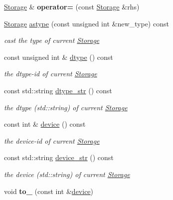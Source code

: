 \begin{DoxyCompactItemize}
\mbox{\label{classcytnx_1_1Storage_a1ee2ea67e2197bc9d690ca8a1b878f73}} 
\hyperlink{classcytnx_1_1Storage}{Storage} \& {\bfseries operator=} (const \hyperlink{classcytnx_1_1Storage}{Storage} \&rhs)
\item 
\hyperlink{classcytnx_1_1Storage}{Storage} \hyperlink{classcytnx_1_1Storage_a8310d8dbb70510272ded2e3d01be25f0}{astype} (const unsigned int \&new\+\_\+type) const
\begin{DoxyCompactList}\small\item\em cast the type of current \hyperlink{classcytnx_1_1Storage}{Storage} \end{DoxyCompactList}\item 
const unsigned int \& \hyperlink{classcytnx_1_1Storage_a643824801e81ab86aca055f1dd1f34d7}{dtype} () const
\begin{DoxyCompactList}\small\item\em the dtype-\/id of current \hyperlink{classcytnx_1_1Storage}{Storage} \end{DoxyCompactList}\item 
const std\+::string \hyperlink{classcytnx_1_1Storage_ab6e9fb01ad4655701a2d54dc978eef17}{dtype\+\_\+str} () const
\begin{DoxyCompactList}\small\item\em the dtype (std\+::string) of current \hyperlink{classcytnx_1_1Storage}{Storage} \end{DoxyCompactList}\item 
const int \& \hyperlink{classcytnx_1_1Storage_a4c3e27582d7f951e6b76ccbb92f7c537}{device} () const
\begin{DoxyCompactList}\small\item\em the device-\/id of current \hyperlink{classcytnx_1_1Storage}{Storage} \end{DoxyCompactList}\item 
const std\+::string \hyperlink{classcytnx_1_1Storage_ae0d90d5275fa7e52a0a2dc10512ba71f}{device\+\_\+str} () const
\begin{DoxyCompactList}\small\item\em the device (std\+::string) of current \hyperlink{classcytnx_1_1Storage}{Storage} \end{DoxyCompactList}\item 
\mbox{\label{classcytnx_1_1Storage_a0bbf2cbefb5d0835bcb4f0d05e400870}} 
void {\bfseries to\+\_\+} (const int \&\hyperlink{classcytnx_1_1Storage_a4c3e27582d7f951e6b76ccbb92f7c537}{device})

\end{DoxyCompactItemize}
